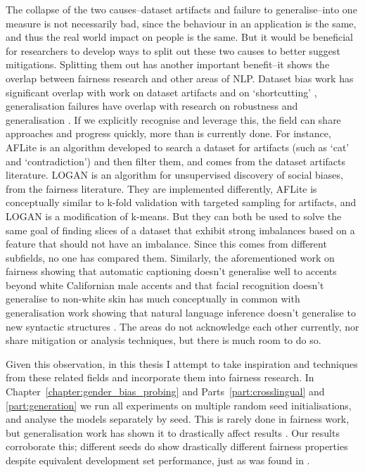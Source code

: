 The collapse of the two causes--dataset artifacts and failure to generalise--into one measure is not necessarily bad, since the behaviour in an application is the same, and thus the real world impact on people is the same. But it would be beneficial for researchers to develop ways to split out these two causes to better suggest mitigations. Splitting them out has another important benefit--it shows the overlap between fairness research and other areas of NLP.  Dataset bias work has significant overlap with work on dataset artifacts and on `shortcutting' \citep{geirhos2020shortcut}, generalisation failures have overlap with research on robustness and generalisation \citep{hupkes2023taxonomy}. If we explicitly recognise and leverage this, the field can share approaches and progress quickly, more than is currently done. For instance, AFLite is an algorithm developed to search a dataset for artifacts (such as `cat' and `contradiction') \citep{LeBras2020AdversarialFO} and then filter them, and comes from the dataset artifacts literature. LOGAN \citep{zhao-chang-2020-logan} is an algorithm for unsupervised discovery of social biases, from the fairness literature. They are implemented differently, AFLite is conceptually similar to k-fold validation with targeted sampling for artifacts, and LOGAN is a modification of k-means. But they can both be used to solve the same goal of finding slices of a dataset that exhibit strong imbalances based on a feature that should not have an imbalance. Since this comes from different subfields, no one has compared them. Similarly, the aforementioned work on fairness showing that automatic captioning doesn't generalise well to accents beyond white Californian male accents \citep{tatman17_interspeech} and that facial recognition doesn't generalise to non-white skin \citep{buolamwini18a} has much conceptually in common with generalisation work showing that natural language inference doesn't generalise to new syntactic structures \citep{mccoy-etal-2020-berts}. The areas do not acknowledge each other currently, nor share mitigation or analysis techniques, but there is much room to do so.

Given this observation, in this thesis I attempt to take inspiration and techniques from these related fields and incorporate them into fairness research. In Chapter~\ref{chapter:gender_bias_probing} and Parts~\ref{part:crosslingual} and \ref{part:generation} we run all experiments on multiple random seed initialisations, and analyse the models separately by seed. This is rarely done in fairness work, but generalisation work has shown it to drastically affect results \citep{mccoy-etal-2020-berts, multiberts}. Our results corroborate this; different seeds do show drastically different fairness properties despite equivalent development set performance, just as was found in \citet{mccoy-etal-2020-berts}.

